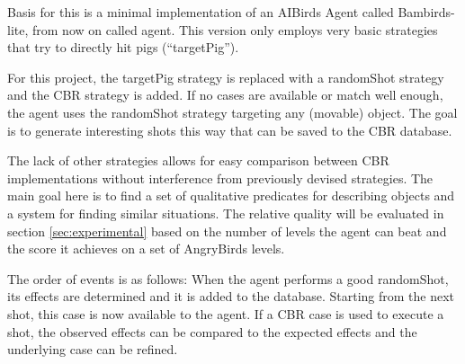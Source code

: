Basis for this is a minimal implementation of an AIBirds Agent called Bambirds-lite, from now on called agent.
This version only employs very basic strategies that try to directly hit pigs (``targetPig'').

For this project, the targetPig strategy is replaced with a randomShot strategy and the CBR strategy is added.
If no cases are available or match well enough, the agent uses the randomShot strategy targeting any (movable) object. The goal is to generate interesting shots this way that can be saved to the \ac{CBR} database.

The lack of other strategies allows for easy comparison between CBR implementations without interference from previously devised strategies.
The main goal here is to find a set of qualitative predicates for describing objects and a system for finding similar situations.
The relative quality will be evaluated in section \ref{sec:experimental} based on the number of levels the agent can beat and the score it achieves on a set of AngryBirds levels.

The order of events is as follows:
When the agent performs a good randomShot, its effects are determined and it is added to the database. Starting from the next shot, this case is now available to the agent. If a \ac{CBR} case is used to execute a shot, the observed effects can be compared to the expected effects and the underlying case can be refined.
